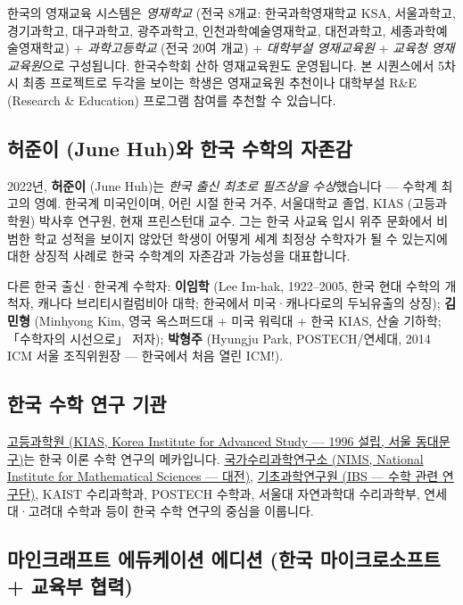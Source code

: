 \documentclass[12pt,a4paper]{scrartcl}
\newcommand{\acc}[1]{\textcolor{accent}{\textbf{#1}}}
\begin{document}
한국의 영재교육 시스템은 \emph{영재학교} (전국 8개교: 한국과학영재학교 KSA, 서울과학고, 경기과학고, 대구과학고, 광주과학고, 인천과학예술영재학교, 대전과학고, 세종과학예술영재학교) + \emph{과학고등학교} (전국 20여 개교) + \emph{대학부설 영재교육원} + \emph{교육청 영재교육원}으로 구성됩니다. 한국수학회 산하 영재교육원도 운영됩니다. 본 시퀀스에서 5차시 최종 프로젝트로 두각을 보이는 학생은 영재교육원 추천이나 대학부설 R\&E (Research \& Education) 프로그램 참여를 추천할 수 있습니다.

\subsection{허준이 (June Huh)와 한국 수학의 자존감}

2022년, \acc{허준이} (June Huh)는 \emph{한국 출신 최초로 필즈상을 수상}했습니다 --- 수학계 최고의 영예. 한국계 미국인이며, 어린 시절 한국 거주, 서울대학교 졸업, KIAS (고등과학원) 박사후 연구원, 현재 프린스턴대 교수. 그는 한국 사교육 입시 위주 문화에서 비범한 학교 성적을 보이지 않았던 학생이 어떻게 세계 최정상 수학자가 될 수 있는지에 대한 상징적 사례로 한국 수학계의 자존감과 가능성을 대표합니다.

다른 한국 출신·한국계 수학자: \acc{이임학} (Lee Im-hak, 1922--2005, 한국 현대 수학의 개척자, 캐나다 브리티시컬럼비아 대학; 한국에서 미국·캐나다로의 두뇌유출의 상징); \acc{김민형} (Minhyong Kim, 영국 옥스퍼드대 + 미국 워릭대 + 한국 KIAS, 산술 기하학; 「수학자의 시선으로」 저자); \acc{박형주} (Hyungju Park, POSTECH/연세대, 2014 ICM 서울 조직위원장 --- 한국에서 처음 열린 ICM!).

\subsection{한국 수학 연구 기관}

\href{http://www.kias.re.kr/}{고등과학원 (KIAS, Korea Institute for Advanced Study --- 1996 설립, 서울 동대문구)}는 한국 이론 수학 연구의 메카입니다. \href{http://www.nims.re.kr/}{국가수리과학연구소 (NIMS, National Institute for Mathematical Sciences --- 대전)}, \href{https://www.ibs.re.kr/}{기초과학연구원 (IBS --- 수학 관련 연구단)}, KAIST 수리과학과, POSTECH 수학과, 서울대 자연과학대 수리과학부, 연세대·고려대 수학과 등이 한국 수학 연구의 중심을 이룹니다.

\subsection{마인크래프트 에듀케이션 에디션 (한국 마이크로소프트 + 교육부 협력)}\label{sec:mee}
\end{document}
